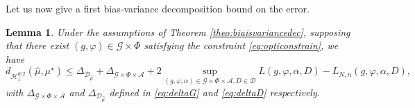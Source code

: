 \documentclass[10pt]{article}
\newtheorem{lemma}{Lemma}
\begin{document}
Let us now give a first bias-variance decomposition bound on the error.
\begin{lemma}\label{lemma:decomptheo}
Under the assumptions of Theorem \ref{theo:biaisvariancedec},   supposing that there exist $(g,\varphi)\in \mathcal{G}\times  \Phi$ satisfying the constraint \eqref{eq:opticonstrain}, we have
    $$d_{\mathcal{H}^{d/2}_1}(\hat{\mu},\mu^\star)\leq \Delta_{\mathcal{D}_{\hat{\mu}}}+ \Delta_{\mathcal{G}\times \Phi \times \mathcal{A}} + 2\sup_{(g,\varphi,\alpha)\in \mathcal{G}\times  \Phi\times \mathcal{A},D\in \mathcal{D}} L(g,\varphi,\alpha,D)-L_{N,n}(g,\varphi,\alpha,D),    $$
    with $\Delta_{\mathcal{G}\times \Phi \times \mathcal{A}}$ and $\Delta_{\mathcal{D}_{\hat{\mu}}}$ defined in \eqref{eq:deltaG} and \eqref{eq:deltaD} respectively.
\end{lemma}
\end{document}
